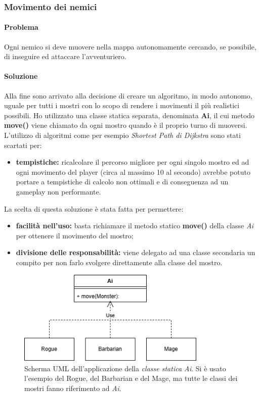 \documentclass{report}
\begin{document}
\clearpage
\subsubsection{Movimento dei nemici}

\paragraph{Problema} Ogni nemico si deve muovere nella mappa autonomamente cercando, se possibile, di inseguire ed attaccare l'avventuriero.

\paragraph{Soluzione} Alla fine sono arrivato alla decisione di creare un algoritmo, in modo autonomo, uguale per tutti i mostri con lo scopo di rendere i movimenti il più realistici possibili. Ho 
%
utilizzato una classe statica separata, denominata \textbf{Ai}, il cui metodo \textbf{move()} viene chiamato da ogni mostro quando è il proprio turno di muoversi. L'utilizzo di algoritmi come per esempio
%
\textit{Shortest Path di Dijkstra} sono stati scartati per:

\begin{itemize}
    \item \textbf{tempistiche:} ricalcolare il percorso migliore per ogni singolo mostro ed ad ogni movimento del player (circa al massimo 10 al secondo) avrebbe potuto portare a tempistiche di calcolo
%
non ottimali e di conseguenza ad un gameplay non performante.
\end{itemize}

%
La scelta di questa soluzione è stata fatta per permettere:

\begin{itemize}
    \item \textbf{facilità nell'uso:} basta richiamare il metodo statico \textbf{move()} della classe \textit{Ai} per ottenere il movimento del mostro;
    \item \textbf{divisione delle responsabilità:} viene delegato ad una classe secondaria un compito per non farlo svolgere direttamente alla classe del mostro.
\end{itemize}

\begin{figure}[H]
    \centering
    \includegraphics[width=9cm]{MonsterMovement.png}
    \caption{Scherma UML dell'applicazione della \textit{classe statica Ai}. Si è usato l'esempio del Rogue, del Barbarian e del Mage, ma tutte le classi dei mostri fanno riferimento ad \textit{Ai}.}
\end{figure}
\end{document}
